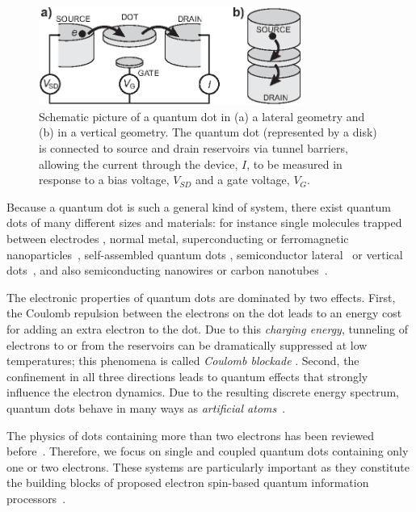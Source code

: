 \documentclass[rmp,twocolumn,aps]{revtex4}
\begin{document}
\begin{figure}[htb]
\includegraphics[width=3.4in, clip=true]{hanson_fig01.eps}
\caption{ Schematic picture of a quantum dot in (a) a lateral
geometry and (b) in a vertical geometry. The quantum dot
(represented by a disk) is connected to source and drain
reservoirs via tunnel barriers, allowing the current through the
device, $I$, to be measured in response to a bias voltage,
$V_{SD}$ and a gate voltage, $V_G$. } \label{fig1:lateraldot}
\end{figure}

Because a quantum dot is such a general kind of system, there
exist quantum dots of many different sizes and materials: for
instance single molecules trapped between electrodes
\cite{Pasupathy}, normal metal\cite{Petta_spin_orbit},
superconducting \cite{Ralph_PRL,RalphReview01} or ferromagnetic
nanoparticles~\cite{Gueron}, self-assembled quantum dots
\cite{McEuen}, semiconductor lateral~\cite{Kouwenhoven97} or
vertical dots~\cite{kouwenhoven01}, and also semiconducting nanowires
or carbon nanotubes~\cite{Bjork_nanowire_dot,dekker99,mceuen2000}.

The electronic properties of quantum dots are dominated by two
effects. First, the Coulomb repulsion between the electrons on the
dot leads to an energy cost for adding an extra electron to the
dot. Due to this \textit{charging energy}, tunneling of electrons
to or from the reservoirs can be dramatically suppressed at low
temperatures; this phenomena is called \textit{Coulomb blockade}
\cite{Beenakker}. Second, the confinement in all three directions
leads to quantum effects that strongly influence the electron
dynamics. Due to the resulting discrete energy spectrum, quantum
dots behave in many ways as \emph{artificial
atoms}~\cite{kouwenhoven01}.

The physics of dots containing more than two electrons has been
reviewed before~\cite{Kouwenhoven97,ReimannRMP}. Therefore, we
focus on single and coupled quantum dots containing only one or
two electrons. These systems are particularly important as they
constitute the building blocks of proposed electron spin-based
quantum information
processors~\cite{LossDiVincenzo,DiVincenzoNature2000,Levy,wulidar02a, wulidar02b,ByrdLidar,Meier,Kyriakidis2005,TaylerNaturePhysics2005,hanson06}.
\end{document}
